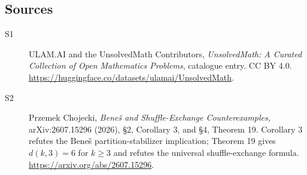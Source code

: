 \documentclass[11pt]{article}
\begin{document}
\subsection{Sources}
\begin{description}
\item[\hypertarget{source:statement:1}{S1}] ULAM.AI and the UnsolvedMath Contributors, \emph{UnsolvedMath: A Curated Collection of Open Mathematics Problems}, catalogue entry. CC BY 4.0. \url{https://huggingface.co/datasets/ulamai/UnsolvedMath}.
\item[\hypertarget{source:statement:2}{S2}] Przemek Chojecki, \emph{Beneš and Shuffle-Exchange Counterexamples}, arXiv:2607.15296 (2026), §2, Corollary 3, and §4, Theorem 19. Corollary 3 refutes the Beneš partition-stabilizer implication; Theorem 19 gives $d(k,3)=6$ for $k\geq3$ and refutes the universal shuffle-exchange formula. \url{https://arxiv.org/abs/2607.15296}.
\end{description}
\label{end:statement}
\end{document}
